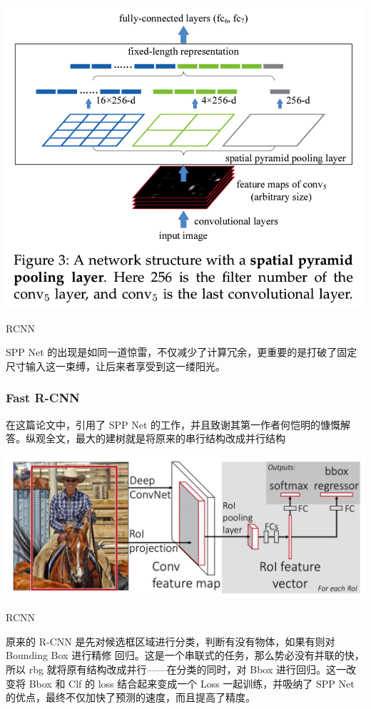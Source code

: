 \begin{uscfigure}
	\includegraphics[width=\textwidth]{./Pictures/sppnet_pool_layer.png}	
	\caption{RCNN}
\end{uscfigure}
SPP Net 的出现是如同一道惊雷，不仅减少了计算冗余，更重要的是打破了固定尺寸输入这一束缚，让后来者享受到这一缕阳光。

\subsubsection{Fast R-CNN}
在这篇论文中，引用了 SPP Net 的工作，并且致谢其第一作者何恺明的慷慨解答。纵观全文，最大的建树就是将原来的串行结构改成并行结构
\begin{uscfigure}
	\includegraphics[width=\textwidth]{./Pictures/fast_rcnn.png}	
	\caption{RCNN}	
\end{uscfigure}
原来的 R-CNN 是先对候选框区域进行分类，判断有没有物体，如果有则对 Bounding Box 进行精修 回归。这是一个串联式的任务，那么势必没有并联的快，所以 rbg 就将原有结构改成并行——在分类的同时，对 Bbox 进行回归。这一改变将 Bbox 和 Clf 的 loss 结合起来变成一个 Loss 一起训练，并吸纳了 SPP Net 的优点，最终不仅加快了预测的速度，而且提高了精度。

